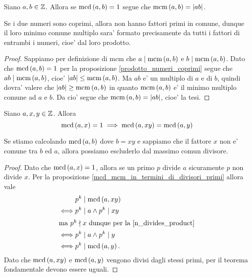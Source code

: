 \begin{proposition}\label{mcm_equals_product}
    Siano $a, b \in \mathbb{Z}$. Allora se $\operatorname{mcd}\left(a, b\right) = 1$ segue che $\operatorname{mcm}\left(a, b\right) = \left|ab\right|$.
\end{proposition}
\begin{intuition}
    Se i due numeri sono coprimi, allora non hanno fattori primi in comune, dunque il loro minimo comune multiplo sara' formato precisamente da tutti i fattori di entrambi i numeri, cioe' dal loro prodotto.
\end{intuition}
\begin{proof}
    Sappiamo per definizione di mcm che $a \mid \operatorname{mcm}\left(a, b\right)$ e $b \mid \operatorname{mcm}\left(a, b\right)$. Dato che $\operatorname{mcd}\left(a, b\right) = 1$ per la proposizione \ref{prodotto_numeri_coprimi} segue che $ab \mid \operatorname{mcm}\left(a, b\right)$, cioe' $\left|ab\right| \leq \operatorname{mcm}\left(a, b\right)$. Ma $ab$ e' un multiplo di $a$ e di $b$, quindi dovra' valere che $\left|ab\right| \geq \operatorname{mcm}\left(a, b\right)$ in quanto $\operatorname{mcm}\left(a, b\right)$ e' il minimo multiplo comune ad $a$ e $b$. Da cio' segue che $\operatorname{mcm}\left(a, b\right) = \left|ab\right|$, cioe' la tesi.
\end{proof}

\begin{proposition} \label{mcd_togliere_fattori_non_comuni}
    Siano $a, x, y \in \mathbb{Z}$. Allora 
    \begin{equation}
        \operatorname{mcd}\left(a, x\right) = 1 \implies \operatorname{mcd}\left(a, xy\right) = \operatorname{mcd}\left(a, y\right)
    \end{equation}
\end{proposition}
\begin{intuition}
    Se stiamo calcolando $\operatorname{mcd}\left(a, b\right)$ dove $b = xy$ e sappiamo che il fattore $x$ non e' comune tra $b$ ed $a$, allora possiamo escluderlo dal massimo comun divisore.
\end{intuition}
\begin{proof}
    Dato che $\operatorname{mcd}\left(a, x\right) = 1$, allora se un primo $p$ divide $a$ sicuramente $p$ non divide $x$. Per la proposizione \ref{mcd_mcm_in_termini_di_divisori_primi} allora vale
    \begin{alignat*}
        {1}
        &p^k \mid \operatorname{mcd}\left(a, xy\right) \\ 
        \iff &p^k \mid a \land p^k \mid xy\\
        \intertext{ma $p^k \nmid x$ dunque per la \ref{n_divides_product}}
        \iff &p^k \mid a \land p^k \mid y \\
        \iff &p^k \mid \operatorname{mcd}\left(a, y\right).
    \end{alignat*}
    Dato che $\operatorname{mcd}\left(a, xy\right)$ e $\operatorname{mcd}\left(a, y\right)$ vengono divisi dagli stessi primi, per il teorema fondamentale devono essere uguali.
\end{proof}

